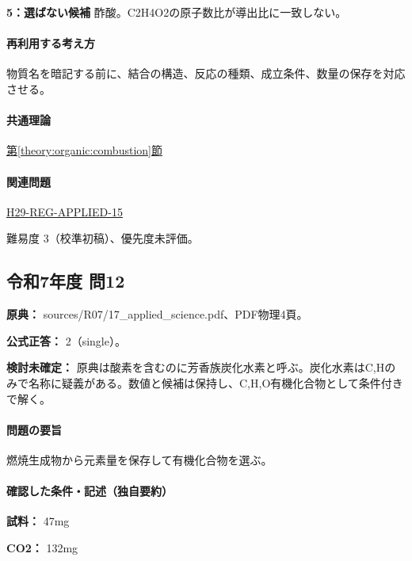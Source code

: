 \noindent\textbf{5：選ばない候補} 酢酸。C2H4O2の原子数比が導出比に一致しない。\par

\paragraph{再利用する考え方} 物質名を暗記する前に、結合の構造、反応の種類、成立条件、数量の保存を対応させる。

\paragraph{共通理論} \hyperref[theory:organic:combustion]{第\ref*{theory:organic:combustion}節}

\paragraph{関連問題} \hyperref[q:h29-reg-applied-15]{H29-REG-APPLIED-15}

\par 難易度 3（校準初稿）、優先度未評価。

\subsection{令和7年度 問12}
\label{q:r07-reg-applied-12}

\noindent\textbf{原典：} sources/R07/17\_applied\_science.pdf、PDF物理4頁。

\textbf{公式正答：} 2（single）。

\par\textbf{検討未確定：} 原典は酸素を含むのに芳香族炭化水素と呼ぶ。炭化水素はC,Hのみで名称に疑義がある。数値と候補は保持し、C,H,O有機化合物として条件付きで解く。

\paragraph{問題の要旨} 燃焼生成物から元素量を保存して有機化合物を選ぶ。

\paragraph{確認した条件・記述（独自要約）}\mbox{}\par

\noindent\textbf{試料：} 47mg\par

\noindent\textbf{CO2：} 132mg\par

